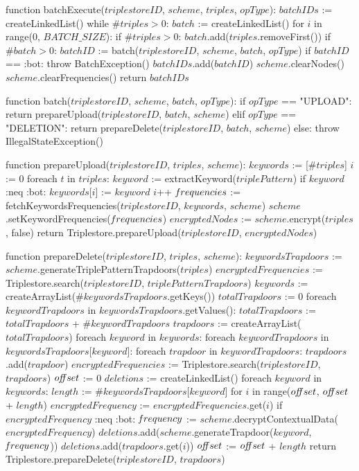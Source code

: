 function batchExecute($triplestoreID$, $scheme$, $triples$, $opType$):
    $batchIDs$ := createLinkedList()
    while $\#triples > 0$: 
        $batch$ := createLinkedList()
        for $i$ in range(0, $BATCH\_SIZE$):
            if $\#triples > 0$:
                $batch$.add($triples$.removeFirst())
        if $\#batch > 0$:
            $batchID$ := batch($triplestoreID$, $scheme$, $batch$, $opType$)
            if $batchID$ == :bot:
                throw BatchException()
            $batchIDs$.add($batchID$)
        $scheme$.clearNodes()
    $scheme$.clearFrequencies()
    return $batchIDs$

function batch($triplestoreID$, $scheme$, $batch$, $opType$):
    if $opType$ == "UPLOAD":
        return prepareUpload($triplestoreID$, $batch$, $scheme$)
    elif $opType$ == "DELETION":
        return prepareDelete($triplestoreID$, $batch$, $scheme$)
    else:
        throw IllegalStateException()
        
function prepareUpload($triplestoreID$, $triples$, $scheme$):
    $keywords$ := [$\#triples$]
    $i$ := 0
    foreach $t$ in $triples$:
        $keyword$ := extractKeyword($triplePattern$) 
        if $keyword$ :neq :bot:
            $keywords$[$i$] := $keyword$
            $i$++
    $\textrm{\emph{f}}requencies$ := fetchKeywordsFrequencies($triplestoreID$, $keywords$, $scheme$)
    $scheme$.setKeywordFrequencies($\textrm{\emph{f}}requencies$)
    $encryptedNodes$ := $scheme$.encrypt($triples$, false)
    return Triplestore.prepareUpload($triplestoreID$, $encryptedNodes$)

function prepareDelete($triplestoreID$, $triples$, $scheme$):
    $keywordsTrapdoors$ := $scheme$.generateTriplePatternTrapdoors($triples$)
    $encryptedFrequencies$ := Triplestore.search($triplestoreID$, $triplePatternTrapdoors$)
    $keywords$ := createArrayList($\#keywordsTrapdoors$.getKeys())
    $totalTrapdoors$ := 0
    foreach $keywordTrapdoors$ in $keywordsTrapdoors$.getValues():
        $totalTrapdoors$ := $totalTrapdoors$ + $\#keywordTrapdoors$
    $trapdoors$ := createArrayList($totalTrapdoors$)
    foreach $keyword$ in $keywords$:
        foreach $keywordTrapdoors$ in $keywordsTrapdoors$[$keyword$]:
            foreach $trapdoor$ in $keywordTrapdoors$:
                $trapdoors$.add($trapdoor$)
    $encryptedFrequencies$ := Triplestore.search($triplestoreID$, $trapdoors$)
    $o\textrm{\emph{ff}}set$ := 0
    $deletions$ := createLinkedList()
    foreach $keyword$ in $keywords$:
        $length$ := $\#keywordsTrapdoors$[$keyword$]
        for $i$ in range($o\textrm{\emph{ff}}set$, $o\textrm{\emph{ff}}set$ + $length$) 
            $encryptedFrequency$ := $encryptedFrequencies$.get($i$)
            if $encryptedFrequency$ :neq :bot:
                $\textrm{\emph{f}}requency$ := $scheme$.decryptContextualData($encryptedFrequency$)
                $deletions$.add($scheme$.generateTrapdoor($keyword$, $\textrm{\emph{f}}requency$))
                $deletions$.add($trapdoors$.get($i$))
        $o\textrm{\emph{ff}}set$ := $o\textrm{\emph{ff}}set$ + $length$
    return Triplestore.prepareDelete($triplestoreID$, $trapdoors$)

